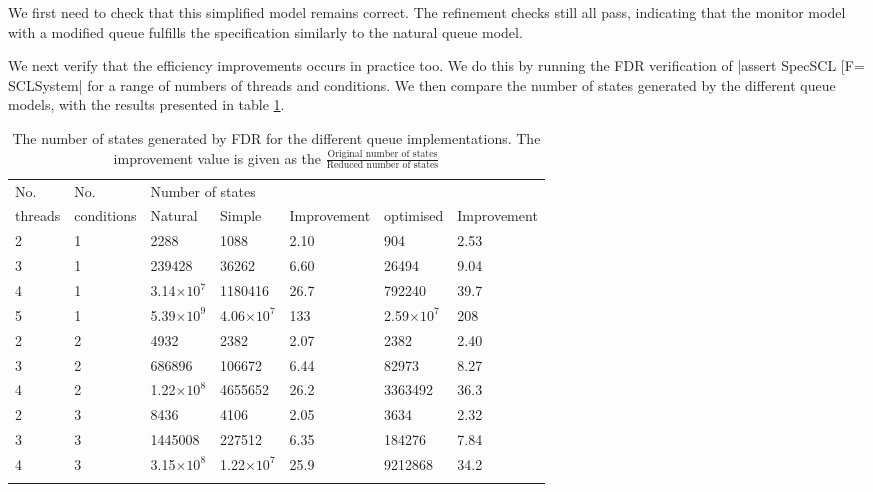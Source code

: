 We first need to check that this simplified model remains correct. The refinement checks still all pass, indicating that the monitor model with a modified queue fulfills the specification similarly to the natural queue model.

We next verify that the efficiency improvements occurs in practice too. We do this by running the FDR verification of |assert SpecSCL [F= SCLSystem| for a range of numbers of threads and conditions. We then compare the number of states generated by the different queue models, with the results presented in table \ref{table:queue}.

\def\thickhline{\noalign{\hrule height 1.5pt}}

\begin{table}
  \renewcommand*{\arraystretch}{1.2}
  \caption{The number of states generated by FDR for the different queue implementations. The improvement value is given as the $\frac{\text{Original number of states}}{\text{Reduced number of states}}$}
    \begin{tabularx}{\linewidth}{|l|l|X|X|X|X|X|}
      \thickhline
      No.&No.& \multicolumn{5}{l|}{Number of states} \\
      threads&conditions& Natural & Simple & Improvement & optimised & Improvement\\
      \thickhline
      2 & 1 & 2288 & 1088 & 2.10& 904 & 2.53\\ \hline
      3 & 1 & 239428 & 36262 & 6.60& 26494 & 9.04 \\ \hline
      4 & 1 & 3.14$\times\text{10}^\text{7}$ & 1180416 & 26.7& 792240 & 39.7\\ \hline
      5 & 1 & 5.39$\times\text{10}^\text{9}$ & 4.06$\times\text{10}^\text{7}$ & 133& 2.59$\times\text{10}^\text{7}$ &208 \\
      \thickhline
      2 & 2 & 4932 & 2382 & 2.07& 2382 & 2.40\\ \hline
      3 & 2 & 686896 & 106672 & 6.44& 82973 & 8.27\\ \hline
      4 & 2 & 1.22$\times\text{10}^\text{8}$ & 4655652 & 26.2& 3363492 & 36.3\\ 
      \thickhline
      2 & 3 & 8436 & 4106 & 2.05& 3634 & 2.32\\ \hline
      3 & 3 & 1445008 & 227512 & 6.35 & 184276 & 7.84\\ \hline
      4 & 3 & 3.15$\times\text{10}^\text{8}$ & 1.22$\times\text{10}^\text{7}$ & 25.9& 9212868 & 34.2\\ 
      \thickhline
    \end{tabularx}
    \label{table:queue}
  \end{table}

